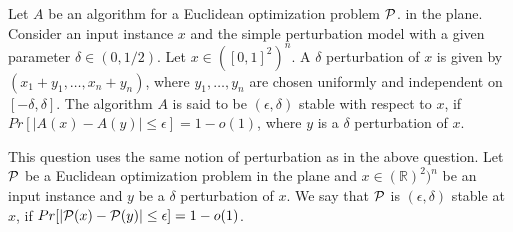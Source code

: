 \documentclass[12pt, a4paper, onecolumn]{exam}
\newcommand{\NP}{\ensuremath{\mathsf{NP}}}
\begin{document}
\begin{questions}
	\question[10]  Let $A$ be an algorithm for a Euclidean optimization problem ${\cal P}$. in the plane. Consider  an input instance $x$ and the simple perturbation model with a given parameter $\delta\in (0,1/2)$.  Let $x\in ([0,1]^2)^n$. A $\delta$ perturbation of $x$ is given by $(x_1+y_1,\ldots, x_n+y_n)$, where $y_1,\ldots, y_n$ are chosen uniformly and independent on $[-\delta, \delta]$.  The  algorithm  $A$ is said to be $(\epsilon,\delta)$ stable with respect to $x$, if $Pr[|A(x) - A(y)|\le  \epsilon] = 1-o(1)$, where $y$ is a $\delta$ perturbation of $x$.


	\question[10] This question uses the same notion of perturbation as in the above question.  Let ${\cal P}$ be a Euclidean optimization problem in the plane and $x\in (\mathbb{R})^2)^n$ be an input instance and $y$ be a $\delta$ perturbation of $x$.  We say that ${\cal P}$ is $(\epsilon,\delta)$ stable at $x$, if $Pr[{|\cal P}(x)-{\cal P}(y)| \le \epsilon] = 1-o(1)$.
\end{questions}
\end{document}
